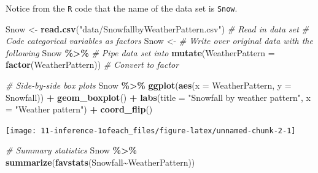 \documentclass[
]{report}
\newenvironment{Shaded}{\begin{snugshade}}{\end{snugshade}}
\newcommand{\CommentTok}[1]{\textcolor[rgb]{0.56,0.35,0.01}{\textit{#1}}}
\newcommand{\DataTypeTok}[1]{\textcolor[rgb]{0.13,0.29,0.53}{#1}}
\newcommand{\KeywordTok}[1]{\textcolor[rgb]{0.13,0.29,0.53}{\textbf{#1}}}
\newcommand{\NormalTok}[1]{#1}
\newcommand{\OperatorTok}[1]{\textcolor[rgb]{0.81,0.36,0.00}{\textbf{#1}}}
\newcommand{\StringTok}[1]{\textcolor[rgb]{0.31,0.60,0.02}{#1}}
\begin{document}
Notice from the \texttt{R} code that the name of the data set is \texttt{Snow}.

\begin{Shaded}
\begin{Highlighting}[]
\NormalTok{Snow \textless{}{-}}\StringTok{ }\KeywordTok{read.csv}\NormalTok{(}\StringTok{"data/SnowfallbyWeatherPattern.csv"}\NormalTok{) }\CommentTok{\# Read in data set}
\CommentTok{\# Code categorical variables as factors}
\NormalTok{Snow \textless{}{-}}\StringTok{ }\CommentTok{\# Write over original data with the following}
\StringTok{  }\NormalTok{Snow }\OperatorTok{\%\textgreater{}\%}\StringTok{ }\CommentTok{\# Pipe data set into}
\StringTok{  }\KeywordTok{mutate}\NormalTok{(}\DataTypeTok{WeatherPattern =} \KeywordTok{factor}\NormalTok{(WeatherPattern)) }\CommentTok{\# Convert to factor}
\end{Highlighting}
\end{Shaded}

\newpage

\begin{Shaded}
\begin{Highlighting}[]
\CommentTok{\# Side{-}by{-}side box plots}
\NormalTok{Snow }\OperatorTok{\%\textgreater{}\%}
\KeywordTok{ggplot}\NormalTok{(}\KeywordTok{aes}\NormalTok{(}\DataTypeTok{x =}\NormalTok{ WeatherPattern, }\DataTypeTok{y =}\NormalTok{ Snowfall)) }\OperatorTok{+}
\StringTok{    }\KeywordTok{geom\_boxplot}\NormalTok{() }\OperatorTok{+}\StringTok{ }
\StringTok{    }\KeywordTok{labs}\NormalTok{(}\DataTypeTok{title =} \StringTok{"Snowfall by weather pattern"}\NormalTok{,}
         \DataTypeTok{x =} \StringTok{"Weather pattern"}\NormalTok{) }\OperatorTok{+}
\StringTok{    }\KeywordTok{coord\_flip}\NormalTok{()}
\end{Highlighting}
\end{Shaded}

\begin{center}\texttt{[image: 11-inference-1ofeach\_files/figure-latex/unnamed-chunk-2-1]} \end{center}

\begin{Shaded}
\begin{Highlighting}[]
\CommentTok{\# Summary statistics}
\NormalTok{Snow }\OperatorTok{\%\textgreater{}\%}\StringTok{ }
\StringTok{     }\KeywordTok{summarize}\NormalTok{(}\KeywordTok{favstats}\NormalTok{(Snowfall}\OperatorTok{\textasciitilde{}}\NormalTok{WeatherPattern))}
\end{Highlighting}
\end{Shaded}
\end{document}
